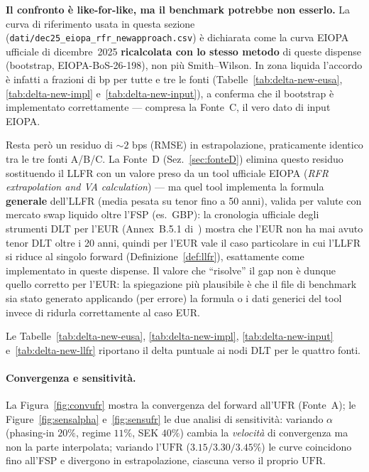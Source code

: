 \documentclass[11pt,a4paper]{article}
\theoremstyle{plain}
\theoremstyle{definition}
\theoremstyle{remark}
\newcommand{\UFR}{\mathrm{UFR}}
\begin{document}
\begin{warningbox}
\textbf{Il confronto \`e like-for-like, ma il benchmark potrebbe non esserlo.} La curva di
riferimento usata in questa sezione (\texttt{dati/dec25\_eiopa\_rfr\_newapproach.csv}) \`e
dichiarata come la curva EIOPA ufficiale di dicembre~2025 \textbf{ricalcolata con lo stesso
metodo} di queste dispense (bootstrap, EIOPA-BoS-26-198), non pi\`u Smith--Wilson. In zona
liquida l'accordo \`e infatti a frazioni di bp per tutte e tre le fonti
(Tabelle~\ref{tab:delta-new-eusa}, \ref{tab:delta-new-impl} e~\ref{tab:delta-new-input}), a
conferma che il bootstrap \`e implementato correttamente --- compresa la Fonte~C, il vero
dato di input EIOPA.

Resta per\`o un residuo di $\sim 2$ bps (RMSE) in estrapolazione, praticamente identico tra
le tre fonti A/B/C. La Fonte~D (Sez.~\ref{sec:fonteD}) elimina questo residuo sostituendo il
LLFR con un valore preso da un tool ufficiale EIOPA (\emph{RFR extrapolation and VA
calculation}) --- ma quel tool implementa la formula \textbf{generale} dell'LLFR (media
pesata su tenor fino a 50 anni), valida per valute con mercato swap liquido oltre l'FSP
(es.\ GBP): la cronologia ufficiale degli strumenti DLT per l'EUR (Annex~B.5.1
di~\cite{eiopa2026}) mostra che l'EUR non ha mai avuto tenor DLT oltre i 20 anni, quindi per
l'EUR vale il caso particolare in cui l'LLFR si riduce al singolo forward
(Definizione~\ref{def:llfr}), esattamente come implementato in queste dispense. Il valore che
``risolve'' il gap non \`e dunque quello corretto per l'EUR: la spiegazione pi\`u plausibile
\`e che il file di benchmark sia stato generato applicando (per errore) la formula o i dati
generici del tool invece di ridurla correttamente al caso EUR.
\end{warningbox}

Le Tabelle~\ref{tab:delta-new-eusa}, \ref{tab:delta-new-impl}, \ref{tab:delta-new-input}
e~\ref{tab:delta-new-llfr} riportano il delta puntuale ai nodi DLT per le quattro fonti.






\paragraph{Convergenza e sensitivit\`a.}
La Figura~\ref{fig:convufr} mostra la convergenza del forward all'$\UFR$ (Fonte~A); le
Figure~\ref{fig:sensalpha} e~\ref{fig:sensufr} le due analisi di sensitivit\`a: variando
$\alpha$ (phasing-in $20\%$, regime $11\%$, SEK $40\%$) cambia la \emph{velocit\`a} di
convergenza ma non la parte interpolata; variando l'$\UFR$ ($3.15/3.30/3.45\%$) le curve
coincidono fino all'FSP e divergono in estrapolazione, ciascuna verso il proprio $\UFR$.
\end{document}
